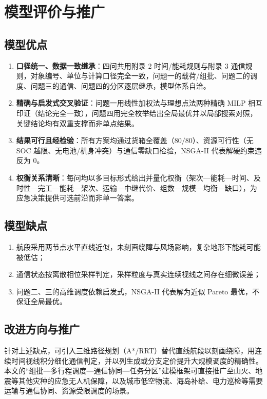 \section{模型评价与推广}

\subsection{模型优点}
\begin{enumerate}[leftmargin=2em]
  \item \textbf{口径统一、数据一致继承}：四问共用附录 2 时间/能耗规则与附录 3 通信规则，对象编号、单位与计算口径完全一致，问题一的载荷/组批、问题二的调度、问题三的通信、问题四的分区逐层继承，模型体系自洽。
  \item \textbf{精确与启发式交叉验证}：问题一用线性加权法与理想点法两种精确 MILP 相互印证（结论完全一致），问题四用完全枚举给出全局最优并以局部搜索对照，关键结论均有双重支撑而非单点结果。
  \item \textbf{结果可行且经检验}：所有方案均通过货箱全覆盖（$80/80$）、资源可行性（无 SOC 越限、无电池/机身冲突）与通信零缺口检验，NSGA-II 代表解硬约束违反为 $0$。
  \item \textbf{权衡关系清晰}：每问均以多目标形式给出并量化权衡（架次—能耗—时间、及时性—完工—能耗—架次、运输—中继代价、组数—规模—均衡—缺口），为应急决策提供可选前沿而非单一答案。
\end{enumerate}

\subsection{模型缺点}
\begin{enumerate}[leftmargin=2em]
  \item 航段采用两节点水平直线近似，未刻画绕障与风场影响，复杂地形下能耗可能被低估；
  \item 通信状态按离散相位采样判定，采样粒度与真实连续视线之间存在细微误差；
  \item 问题二、三的高维调度依赖启发式，NSGA-II 代表解为近似 Pareto 最优，不保证全局最优。
\end{enumerate}

\subsection{改进方向与推广}

针对上述缺点，可引入三维路径规划（A*/RRT）替代直线航段以刻画绕障，用连续时间视线积分细化通信判定，并以列生成或分支定价提升大规模调度的精确性。本文的“组批—多行程调度—通信协同—任务分区”建模框架可直接推广至山火、地震等其他灾种的应急无人机保障，以及城市低空物流、海岛补给、电力巡检等需要运输与通信协同、资源受限调度的场景。
